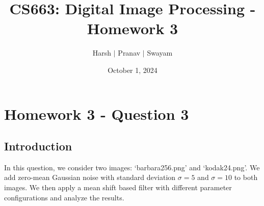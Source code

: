 \documentclass{article}
\title{CS663: Digital Image Processing - Homework 3}
\author{Harsh $\vert$ Pranav $\vert$ Swayam}
\date{October 1, 2024}
\begin{document}
\maketitle
\section{Homework 3 - Question 3}

\subsection{Introduction}
In this question, we consider two images: `barbara256.png' and `kodak24.png'. We add zero-mean Gaussian noise with standard deviation $\sigma = 5$ and $\sigma = 10$ to both images. We then apply a mean shift based filter with different parameter configurations and analyze the results.
\end{document}
